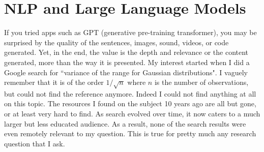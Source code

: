 \documentclass[oneside,10pt]{book}
\begin{document}








\chapter{NLP and Large Language Models}\label{nlpllm}

If you tried apps such as \textcolor{index}{GPT} (generative pre-training transformer), you may be surprised by the quality of the sentences, images, sound, videos, or code generated. Yet, in the end, the value is the depth and relevance or the content generated, more than the way it is presented. My interest started when I did a Google search for ``variance of the range for Gaussian distributions". I vaguely remember that it is of the order $1/\sqrt{n}$ where $n$ is the number of observations, but could not find the reference anymore. Indeed I could not find anything at all on this topic. The resources I found on the subject 10 years ago are all but gone, or at least very hard to find. As search evolved over time, it now caters to a much larger but less educated audience. As a result, none of the search results were even remotely relevant to my question. This is true for pretty much any research question that I ask. 
\end{document}
